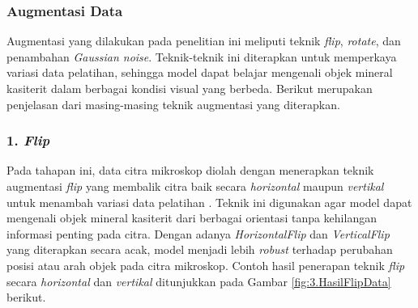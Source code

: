 

\subsubsection{Augmentasi Data}
Augmentasi yang dilakukan pada penelitian ini meliputi teknik \textit{flip}, \textit{rotate}, dan penambahan \textit{Gaussian noise}. Teknik-teknik ini diterapkan untuk memperkaya variasi data pelatihan, sehingga model dapat belajar mengenali objek mineral kasiterit dalam berbagai kondisi visual yang berbeda. Berikut merupakan penjelasan dari masing-masing teknik augmentasi yang diterapkan.\par

\subsubsection*{\textnormal{1. \textit{Flip}}}
Pada tahapan ini, data citra mikroskop diolah dengan menerapkan teknik augmentasi \textit{flip} yang membalik citra baik secara \textit{horizontal} maupun \textit{vertikal} untuk menambah variasi data pelatihan \cite{thesisNova}. Teknik ini digunakan agar model dapat mengenali objek mineral kasiterit dari berbagai orientasi tanpa kehilangan informasi penting pada citra. Dengan adanya \textit{HorizontalFlip} dan \textit{VerticalFlip} yang diterapkan secara acak, model menjadi lebih \textit{robust} terhadap perubahan posisi atau arah objek pada citra mikroskop. Contoh hasil penerapan teknik \textit{flip} secara \textit{horizontal} dan \textit{vertikal} ditunjukkan pada Gambar \ref{fig:3.HasilFlipData} berikut.\par

